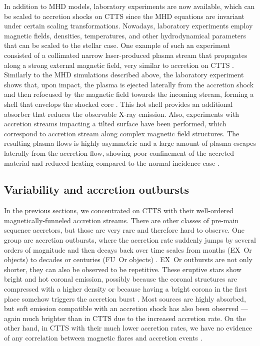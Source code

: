 In addition to MHD models, laboratory experiments are now available, which can be scaled to accretion shocks on CTTS since the MHD equations are invariant under certain scaling transformations. Nowadays, laboratory experiments employ magnetic fields, densities, temperatures, and other hydrodynamical parameters that can be scaled to the stellar case. 
One example of such an experiment consisted of a collimated narrow laser-produced plasma stream that propagates along a strong external magnetic field, very similar to accretion on CTTS \cite{Revet_2017}. Similarly to the MHD simulations described above, the laboratory experiment shows
that, upon impact, the plasma is ejected laterally from the accretion shock and then refocused by the magnetic field towards the incoming stream, forming a shell that envelops the shocked core \cite{Revet_2017}. This hot shell provides an additional absorber that reduces the observable  X-ray emission. Also, experiments with accretion streams impacting a tilted surface have been performed, which correspond to accretion stream along complex magnetic field structures. The resulting plasma flows is highly asymmetric and a large amount of plasma escapes laterally from the accretion flow, showing poor confinement of the accreted material and reduced heating compared to the normal
incidence case \cite{Burdonov_2020}.

\subsection{Variability and accretion outbursts}
In the previous sections, we concentrated on CTTS with their well-ordered magnetically-funneled accretion streams. There are other classes of pre-main sequence accretors, but those are very rare and therefore hard to observe. One group are accretion outbursts, where the accretion rate suddenly jumps by several orders of magnitude and then decays back over time scales from months (EX~Or objects) to decades or centuries (FU~Or objects) \cite{2014prpl.conf..387A}. EX~Or outbursts are not only shorter, they can also be observed to be repetitive. These eruptive stars show bright and hot coronal emission, possibly because the coronal structures are compressed with a higher density or because having a bright corona in the first place somehow triggers the accretion burst \cite{2011ApJ...741...83T,2019ApJ...883..117K}. Most sources are highly absorbed, but soft emission compatible with an accretion shock has also been observed \cite{2010A&A...522A..56G}---again much brighter than in CTTS due to the increased accretion rate. 
On the other hand, in CTTS with their much lower accretion rates, we have no evidence of any correlation between magnetic flares and accretion events \cite{1997A&A...324..155G,2019ApJ...876..121E}.


